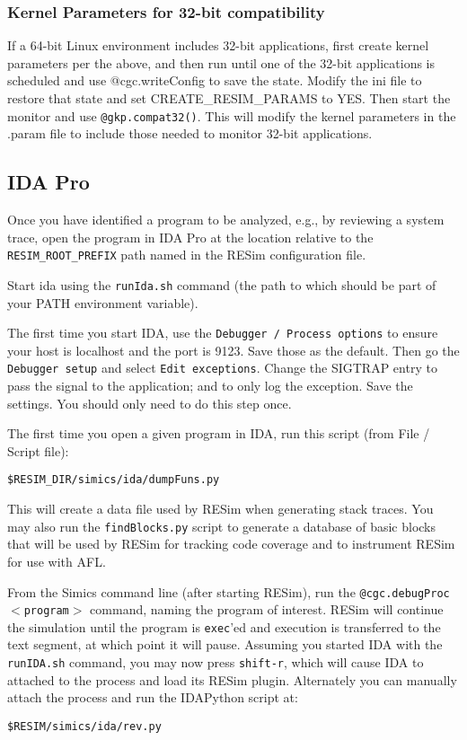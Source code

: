 \documentclass[titlepage]{article}
\begin{document}
\subsubsection{Kernel Parameters for 32-bit compatibility}
If a 64-bit Linux environment includes 32-bit applications, first create kernel parameters per the above, and then run until one of the 32-bit applications
is scheduled and use @cgc.writeConfig to save
the state.  Modify the ini file to restore that state and set CREATE\_RESIM\_PARAMS to YES.  Then start the monitor and use
{\tt @gkp.compat32()}.  This will modify the kernel parameters in the .param file to include those needed to monitor 32-bit applications.

\subsection{IDA Pro}
\label{ida}
Once you have identified a program to be analyzed, e.g., by reviewing a system trace, open the program in IDA Pro at the location relative to the 
{\tt RESIM\_ROOT\_PREFIX} path named in the RESim configuration file.  

Start ida using the {\tt runIda.sh} command (the path to which should be part of your PATH environment variable).

The first time you start IDA, use the {\tt Debugger / Process options} to ensure your host is localhost and the port is 9123.  Save those as 
the default.  Then go the {\tt Debugger setup} and select {\tt Edit exceptions}.  Change the SIGTRAP entry to pass the signal to the application;
and to only log the exception.  Save the settings.  You should only need to do this step once.

The first time you open a given program in IDA, run this script (from File / Script file):
\begin{verbatim}
$RESIM_DIR/simics/ida/dumpFuns.py 
\end{verbatim}
\noindent This will create a data file used by RESim when generating stack traces.
You may also run the {\tt findBlocks.py} script to generate a database of basic blocks that will be used by RESim for tracking code
coverage and to instrument RESim for use with AFL.

From the Simics command line (after starting RESim), run the {\tt @cgc.debugProc$<$program$>$} command, naming the program of interest.
RESim will continue the simulation until the program is {\tt exec}'ed and execution is transferred to the text segment, at which point it will pause.
Assuming you started IDA with the {\tt runIDA.sh} command, you may now press {\tt shift-r}, which will cause IDA to attached to the
process and load its RESim plugin.  Alternately you can manually attach the process and run the IDAPython script at:
\begin{verbatim}
$RESIM/simics/ida/rev.py
\end{verbatim}
\end{document}
